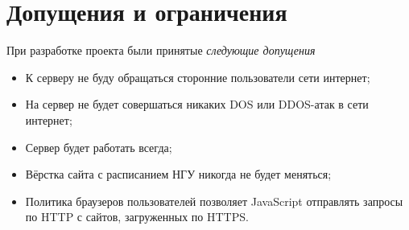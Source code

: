 \chapter{Допущения и ограничения}
	\label{chapter5}

	При разработке проекта были принятые \textit{следующие допущения}
	\begin{itemize}
		\item К серверу не буду обращаться сторонние пользователи сети интернет;
		
		\item На сервер не будет совершаться никаких DOS или DDOS-атак в сети интернет;
				
		\item Сервер будет работать всегда;
			
		\item Вёрстка сайта с расписанием НГУ никогда не будет меняться;
		
		\item Политика браузеров пользователей позволяет JavaScript отправлять запросы по HTTP с сайтов, загруженных по HTTPS.
	\end{itemize}
